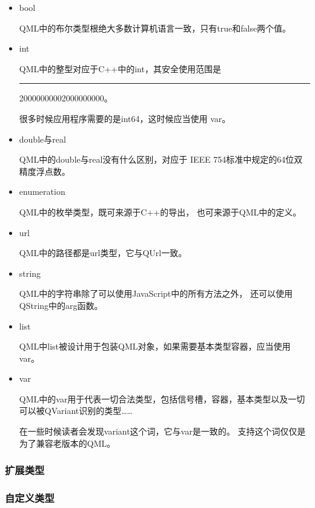 \begin{itemize}

\item bool

QML中的布尔类型根绝大多数计算机语言一致，只有true和false两个值。
\item int

QML中的整型对应于C{\sourcefonttwo{}+}{\sourcefonttwo{}+}中的int，其安全使用范围是
\hspace{0.05em}\rule[0.7ex]{0.4em}{0.65pt}\hspace{0.05em}2000000000\raisebox{0.16ex}{\sourcefonttwo\~{}}2000000000。

很多时候应用程序需要的是int64，这时候应当使用
var。

\item double与real

QML中的double与real没有什么区别，对应于
IEEE 754标准中规定的64位双精度浮点数。
\item enumeration

QML中的枚举类型，既可来源于C{\sourcefonttwo{}+}{\sourcefonttwo{}+}的导出，
也可来源于QML中的定义。
\item url

QML中的路径都是url类型，它与QUrl一致。
\item string

QML中的字符串除了可以使用JavaScript中的所有方法之外，
还可以使用QString中的arg函数。
\item list

QML中list被设计用于包装QML对象，如果需要基本类型容器，应当使用var。
\item var

QML中的var用于代表一切合法类型，包括信号槽，容器，基本类型以及一切
可以被QVariant识别的类型……

在一些时候读者会发现variant这个词，它与var是一致的。
支持这个词仅仅是为了兼容老版本的QML。

\end{itemize}

\FloatBarrier
\subsubsection{
扩展类型
}\label{c000011s000000s01s02}



\FloatBarrier
\subsubsection{
自定义类型
}\label{c000011s000000s01s03}

